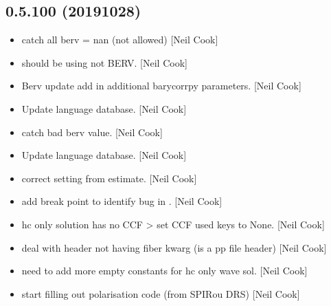 \documentclass[a4paper,10pt,english]{report}
\begin{document}
\subsection{0.5.100 (2019\sphinxhyphen{}10\sphinxhyphen{}28)}
\label{\detokenize{misc/changelog:id61}}\begin{itemize}
\item {} 
 \sphinxhyphen{} catch all berv = nan (not allowed) {[}Neil
Cook{]}

\item {} 
 \sphinxhyphen{} should be using  not BERV. {[}Neil
Cook{]}

\item {} 
Berv update \sphinxhyphen{} add in additional barycorrpy parameters. {[}Neil Cook{]}

\item {} 
Update language database. {[}Neil Cook{]}

\item {} 
 \sphinxhyphen{} catch bad berv value. {[}Neil Cook{]}

\item {} 
Update language database. {[}Neil Cook{]}

\item {} 
 \sphinxhyphen{} correct setting  from estimate.
{[}Neil Cook{]}

\item {} 
 \sphinxhyphen{} add break point to identify bug in
. {[}Neil Cook{]}

\item {} 
 \sphinxhyphen{} hc only solution has no CCF \textendash{}\textgreater{} set CCF used
keys to None. {[}Neil Cook{]}

\item {} 
 \sphinxhyphen{} deal with header not having fiber kwarg (is a
pp file header) {[}Neil Cook{]}

\item {} 
 \sphinxhyphen{} need to add more empty constants for hc only
wave sol. {[}Neil Cook{]}

\item {} 
 \sphinxhyphen{} start filling out polarisation code (from SPIRou
DRS) {[}Neil Cook{]}


\end{itemize}
\end{document}
